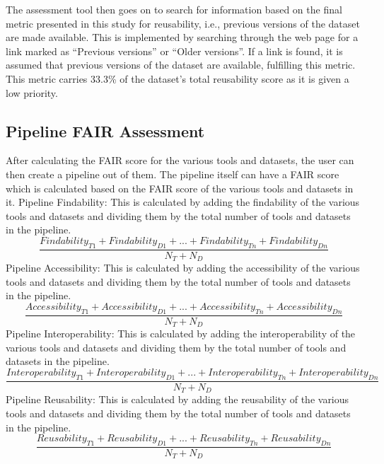 \documentclass{cisfyp}
\begin{document}
The assessment tool then goes on to search for information based on the final metric presented in this study for reusability, i.e., previous versions of the dataset are made available. This is implemented by searching through the web page for a link marked as ``Previous versions'' or ``Older versions''. If a link is found, it is assumed that previous versions of the dataset are available, fulfilling this metric. This metric carries 33.3\% of the dataset's total reusability score as it is given a low priority.\pagebreak
\subsection{Pipeline FAIR Assessment}
After calculating the FAIR score for the various tools and datasets, the user can then create a pipeline out of them. The pipeline itself can have a FAIR score which is calculated based on the FAIR score of the various tools and datasets in it.\newline\newline
Pipeline Findability:\newline
This is calculated by adding the findability of the various tools and datasets and dividing them by the total number of tools and datasets in the pipeline.\newline
\begin{equation}
\frac{Findability_{T1} + Findability_{D1} + ... + Findability_{Tn} + Findability_{Dn}}{N_{T}+N_{D}}
\end{equation}
\newline Pipeline Accessibility:\newline
This is calculated by adding the accessibility of the various tools and datasets and dividing them by the total number of tools and datasets in the pipeline.\newline
\begin{equation}
\frac{Accessibility_{T1} + Accessibility_{D1} + ... + Accessibility_{Tn} + Accessibility_{Dn}}{N_{T}+N_{D}}
\end{equation}
\newline Pipeline Interoperability:\newline
This is calculated by adding the interoperability of the various tools and datasets and dividing them by the total number of tools and datasets in the pipeline.\newline
\begin{equation}
\frac{Interoperability_{T1} + Interoperability_{D1} + ... + Interoperability_{Tn} + Interoperability_{Dn}}{N_{T}+N_{D}}
\end{equation}
\newline Pipeline Reusability:\newline
This is calculated by adding the reusability of the various tools and datasets and dividing them by the total number of tools and datasets in the pipeline.\newline
\begin{equation}
\frac{Reusability_{T1} + Reusability_{D1} + ... + Reusability_{Tn} + Reusability_{Dn}}{N_{T}+N_{D}}
\end{equation}
\end{document}
